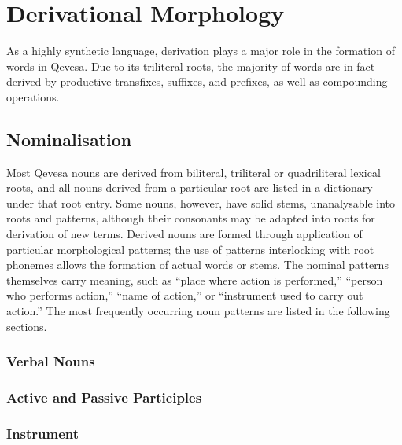 \documentclass[grammar]{subfiles}
\begin{document}
	\chapter{Derivational Morphology}
	\label{ch:lexical-morphology}

	As a highly synthetic language, derivation plays a major role in the formation of words in Qevesa.  Due to its triliteral roots, the majority of words are in fact derived by productive transfixes, suffixes, and prefixes, as well as compounding operations.

	\section{Nominalisation}
	\label{sec:dev_nominalisation}

	Most Qevesa nouns are derived from biliteral, triliteral or quadriliteral lexical roots, and all nouns derived from a particular root are listed in a dictionary under that root entry.  Some nouns, however, have solid stems, unanalysable into roots and patterns, although their consonants may be adapted into roots for derivation of new terms.  Derived nouns are formed through application of particular morphological patterns; the use of patterns interlocking with root phonemes allows the formation of actual words or stems.  The nominal patterns themselves carry meaning, such as “place where action is performed,” “person who performs action,” “name of action,” or “instrument used to carry out action.” The most frequently occurring noun patterns are listed in the following sections.

	\subsection{Verbal Nouns}
	\label{ssec:dev_verbal_nouns}

	\ToBeWritten

	\subsection{Active and Passive Participles}
	\label{ssec:dev_active_passive_participles}

	\ToBeWritten

	\subsection{Instrument}
	\label{ssec:dev_nouns_instrument}

	\ToBeWritten
\end{document}
